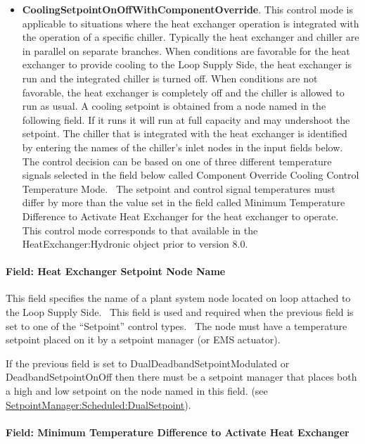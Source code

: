 \begin{itemize}
\item
  \textbf{CoolingSetpointOnOffWithComponentOverride}.  This control mode is applicable to situations where the heat exchanger operation is integrated with the operation of a specific chiller.  Typically the heat exchanger and chiller are in parallel on separate branches.  When conditions are favorable for the heat exchanger to provide cooling to the Loop Supply Side, the heat exchanger is run and the integrated chiller is turned off.  When conditions are not favorable, the heat exchanger is completely off and the chiller is allowed to run as usual.  A cooling setpoint is obtained from a node named in the following field.  If it runs it will run at full capacity and may undershoot the setpoint.  The chiller that is integrated with the heat exchanger is identified by entering the names of the chiller's inlet nodes in the input fields below.~ The control decision can be based on one of three different temperature signals selected in the field below called Component Override Cooling Control Temperature Mode.~ The setpoint and control signal temperatures must differ by more than the value set in the field called Minimum Temperature Difference to Activate Heat Exchanger for the heat exchanger to operate. This control mode corresponds to that available in the HeatExchanger:Hydronic object prior to version 8.0.
\end{itemize}

\paragraph{Field: Heat Exchanger Setpoint Node Name}\label{field-heat-exchanger-setpoint-node-name}

This field specifies the name of a plant system node located on loop attached to the Loop Supply Side.~ This field is used and required when the previous field is set to one of the ``Setpoint'' control types.~ The node must have a temperature setpoint placed on it by a setpoint manager (or EMS actuator).

If the previous field is set to DualDeadbandSetpointModulated or DeadbandSetpointOnOff then there must be a setpoint manager that places both a high and low setpoint on the node named in this field. (see \hyperref[setpointmanagerscheduleddualsetpoint]{SetpointManager:Scheduled:DualSetpoint}).

\paragraph{Field: Minimum Temperature Difference to Activate Heat Exchanger}\label{field-minimum-temperature-difference-to-activate-heat-exchanger}

